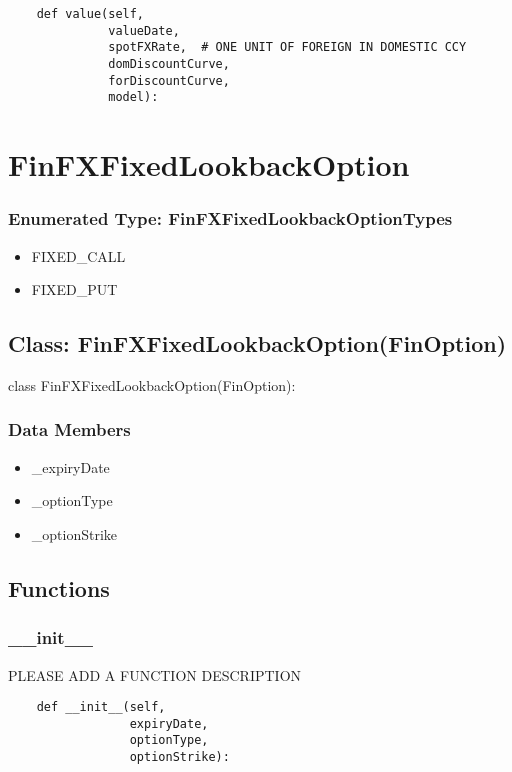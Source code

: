 \documentclass[twoside,11pt]{book}
\begin{document}
\begin{lstlisting}
    def value(self,
              valueDate,
              spotFXRate,  # ONE UNIT OF FOREIGN IN DOMESTIC CCY
              domDiscountCurve,
              forDiscountCurve,
              model):
\end{lstlisting}

\newpage
\section{FinFXFixedLookbackOption}

\subsubsection{Enumerated Type: FinFXFixedLookbackOptionTypes}
\begin{itemize}
\item{FIXED\_CALL}
\item{FIXED\_PUT}
\end{itemize}

\subsection*{Class: FinFXFixedLookbackOption(FinOption)}
class FinFXFixedLookbackOption(FinOption): 

\subsubsection*{Data Members}
\begin{itemize}
\item{\_expiryDate}
\item{\_optionType}
\item{\_optionStrike}
\end{itemize}

\subsection*{Functions}

\subsubsection*{{\bf \_\_init\_\_}}
PLEASE ADD A FUNCTION DESCRIPTION

\begin{lstlisting}
    def __init__(self,
                 expiryDate,
                 optionType,
                 optionStrike):
\end{lstlisting}
\end{document}
